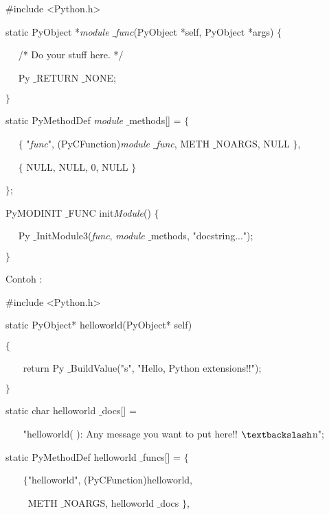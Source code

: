 \documentclass{wileySix}
\begin{document}
\begin{myEnumerate}
{\begin{myEnumerate}
\noindent 
$  \#  $include <Python.h> \par
\vspace{12pt}
\noindent 
static PyObject *\textit{module $  \_  $func}(PyObject *self, PyObject *args)  $  \{  $ \par
\noindent 
~~ /* Do your stuff here. */ \par
\noindent 
~~ Py $  \_  $RETURN $  \_  $NONE; \par
\noindent 
$  \}  $ \par
\vspace{12pt}
\noindent 
static PyMethodDef \textit{module} $  \_  $methods[] =  $  \{  $ \par
\noindent 
~~  $  \{  $ "\textit{func}", (PyCFunction)\textit{module $  \_  $func}, METH $  \_  $NOARGS, NULL  $  \}  $, \par
\noindent 
~~  $  \{  $ NULL, NULL, 0, NULL  $  \}  $ \par
\noindent 
$  \}  $; \par
\vspace{12pt}
\noindent 
PyMODINIT $  \_  $FUNC init\textit{Module}()  $  \{  $ \par
\noindent 
~~ Py $  \_  $InitModule3(\textit{func}, \textit{module} $  \_  $methods, "docstring..."); \par
\noindent 
$  \}  $ \par
\vspace{12pt}
\noindent 
Contoh : \par
\noindent 
$  \#  $include <Python.h> \par
\vspace{12pt}
\noindent 
static PyObject* helloworld(PyObject* self) \par
\noindent 
$  \{  $ \par
\noindent 
~~~ return Py $  \_  $BuildValue("s", "Hello, Python extensions!!"); \par
\noindent 
$  \}  $ \par
\vspace{12pt}
\noindent 
static char helloworld $  \_  $docs[] = \par
\noindent 
~~~ "helloworld( ): Any message you want to put here!! $  \textbackslash  $n"; \par
\vspace{12pt}
\noindent 
static PyMethodDef helloworld $  \_  $funcs[] =  $  \{  $ \par
\noindent 
~~~  $  \{  $"helloworld", (PyCFunction)helloworld,  \par
\noindent 
~~~~ METH $  \_  $NOARGS, helloworld $  \_  $docs $  \}  $, \par

\end{myEnumerate}}
\end{myEnumerate}
\end{document}
